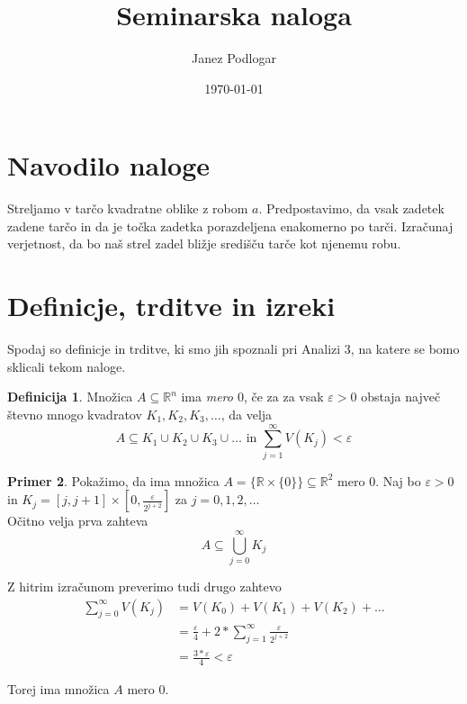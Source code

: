 \documentclass{amsart}
\title{Seminarska naloga}
\author{Janez Podlogar}
\date{\today}
\newcommand{\R}{\mathbb{R}}
\theoremstyle{definition} %
\newtheorem{definicija}{Definicija}[section]
\newtheorem{primer}[definicija]{Primer}
\theoremstyle{plain} %
\begin{document}
\maketitle
\section{Navodilo naloge}
Streljamo v tarčo kvadratne oblike z robom $a$. Predpostavimo, da vsak zadetek zadene
tarčo in da je točka zadetka porazdeljena enakomerno po tarči. Izračunaj verjetnost, da
bo naš strel zadel bližje središču tarče kot njenemu robu.

\section{Definicje, trditve in izreki}

Spodaj so definicje in trditve, ki smo jih spoznali pri Analizi 3, na katere se bomo sklicali tekom naloge.
\begin{definicija}\label{def}
Množica $ A \subseteq \R^n $ ima \emph{mero $0$}, če za za vsak $\varepsilon > 0$ obstaja največ števno mnogo
kvadratov $K_1,K_2,K_3,\ldots$, da velja
\begin{equation*}
    A \subseteq K_1 \cup K_2 \cup K_3 \cup \ldots \text{ in } \sum_{j = 1}^{\infty} V(K_j) < \varepsilon
\end{equation*}
\end{definicija}

\begin{primer}\label{pri}
Pokažimo, da ima množica $A = \{ \R \times \{0\} \} \subseteq \R^2$ mero $0$.
Naj bo $ \varepsilon > 0 $ in $ K_j = \left[j,j+1\right] \times \left[0,\frac{\varepsilon}{2^{j+2}}\right] $ 
za $ j = 0,1,2,\ldots $ \\

Očitno velja prva zahteva
\begin{equation*}
    A \subseteq \bigcup_{j=0}^{\infty} K_{j}
\end{equation*}

Z hitrim izračunom preverimo tudi drugo zahtevo
\begin{align*}
    \sum_{j = 0}^{\infty} V(K_j) 
    &= V(K_0) + V(K_1) + V(K_2) + \ldots \\
    &= \frac{\varepsilon}{4} + 2 * \sum_{j = 1}^{\infty} \frac{\varepsilon}{2^{j+2}} \\
    &= \frac{3*\varepsilon}{4} < \varepsilon
\end{align*}

Torej ima množica $A$ mero $0$.

\end{primer}
\end{document}
